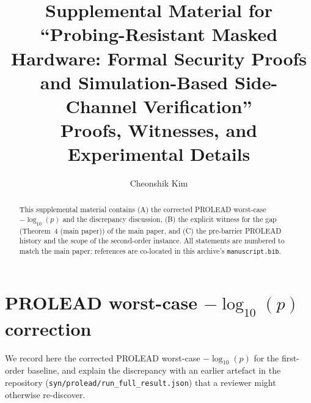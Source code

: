 \documentclass[journal,onecolumn]{IEEEtran}
\begin{document}
\newcommand{\GF}{\mathrm{GF}}
\newcommand{\share}[2]{#1^{(#2)}}
\newcommand{\Adv}{\mathcal{A}}
\newcommand{\prob}[1]{\Pr\!\left[#1\right]}

\newtheorem{theorem}{Theorem}
\newtheorem{lemma}{Lemma}
\newtheorem{definition}{Definition}
\newtheorem{corollary}{Corollary}
\newtheorem{remark}{Remark}


\title{Supplemental Material for ``Probing-Resistant Masked Hardware: Formal Security Proofs and Simulation-Based Side-Channel Verification''\\
\large Proofs, Witnesses, and Experimental Details}

\author{Cheonshik Kim}


\maketitle

\begin{abstract}
This supplemental material contains (A) the corrected PROLEAD
worst-case $-\log_{10}(p)$ and the discrepancy discussion,
(B) the explicit witness for the gap
(Theorem~4 (main paper)) of the main paper, and (C) the pre-barrier PROLEAD history and the scope of the second-order instance.  All statements are numbered to match
the main paper; references are co-located in this archive's
\texttt{manuscript.bib}.
\end{abstract}

\renewcommand{\thesection}{S\arabic{section}}
\renewcommand{\thetheorem}{S\arabic{theorem}}
\renewcommand{\thelemma}{S\arabic{lemma}}
\renewcommand{\thecorollary}{S\arabic{corollary}}
\renewcommand{\theremark}{S\arabic{remark}}
\renewcommand{\thedefinition}{S\arabic{definition}}

\section{PROLEAD worst-case $-\log_{10}(p)$ correction}
\label{app:prolead-corr}

We record here the corrected PROLEAD worst-case
$-\log_{10}(p)$ for the first-order baseline, and explain the
discrepancy with an earlier artefact in the repository
(\texttt{syn/\allowbreak{}prolead/\allowbreak{}run\_\allowbreak{}full\_\allowbreak{}result.json}) that a reviewer
might otherwise re-discover.
\end{document}
